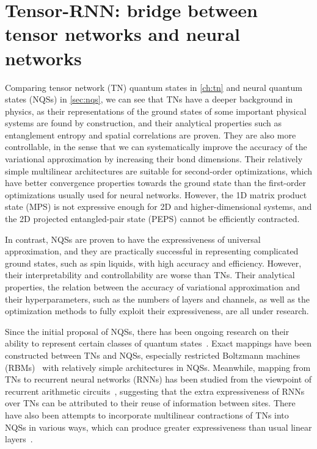 \chapter{Tensor-RNN: bridge between tensor networks and neural networks}
\label{ch:tensor-rnn}

Comparing tensor network (TN) quantum states in \cref{ch:tn} and neural quantum states (NQSs) in \cref{sec:nqs}, we can see that TNs have a deeper background in physics, as their representations of the ground states of some important physical systems are found by construction, and their analytical properties such as entanglement entropy and spatial correlations are proven. They are also more controllable, in the sense that we can systematically improve the accuracy of the variational approximation by increasing their bond dimensions. Their relatively simple multilinear architectures are suitable for second-order optimizations, which have better convergence properties towards the ground state than the first-order optimizations usually used for neural networks. However, the 1D matrix product state (MPS) is not expressive enough for 2D and higher-dimensional systems, and the 2D projected entangled-pair state (PEPS) cannot be efficiently contracted.

In contrast, NQSs are proven to have the expressiveness of universal approximation, and they are practically successful in representing complicated ground states, such as spin liquids, with high accuracy and efficiency. However, their interpretability and controllability are worse than TNs. Their analytical properties, the relation between the accuracy of variational approximation and their hyperparameters, such as the numbers of layers and channels, as well as the optimization methods to fully exploit their expressiveness, are all under research.

Since the initial proposal of NQSs, there has been ongoing research on their ability to represent certain classes of quantum states~\cite{gao2017efficient, carleo2018constructing, sharir2022neural}. Exact mappings have been constructed between TNs and NQSs, especially restricted Boltzmann machines (RBMs)~\cite{glasser2018neural, chen2018equivalence} with relatively simple architectures in NQSs. Meanwhile, mapping from TNs to recurrent neural networks (RNNs) has been studied from the viewpoint of recurrent arithmetic circuits~\cite{levine2017long, levine2019quantum}, suggesting that the extra expressiveness of RNNs over TNs can be attributed to their reuse of information between sites. There have also been attempts to incorporate multilinear contractions of TNs into NQSs in various ways, which can produce greater expressiveness than usual linear layers~\cite{hibat2021variational, hibat2022supplementing, chen2023antn}.

